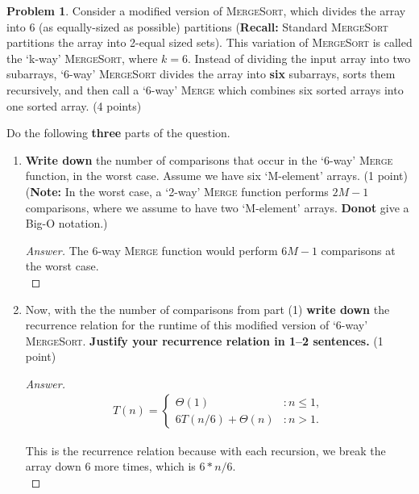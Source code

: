 \documentclass[11pt]{article}
\theoremstyle{definition}
\theoremstyle{definition}
\newtheorem{required}{Problem}
\theoremstyle{definition}
\begin{document}
\setcounter{required}{18}
\begin{required} 
Consider a modified version of \textsc{MergeSort}, which divides the array into 6 (as equally-sized as possible) partitions (\textbf{Recall:} Standard \textsc{MergeSort} partitions the array into 2-equal sized sets). This variation of \textsc{MergeSort} is called the `k-way' \textsc{MergeSort}, where $k = 6$. Instead of dividing
the input array into two subarrays, `6-way' \textsc{MergeSort} divides the array into \textbf{six} subarrays, sorts them recursively, and then call a `6-way' \textsc{Merge} which combines six sorted arrays into one sorted array. (4 points)

Do the following \textbf{three} parts of the question.

\begin{enumerate}
\item \textbf{Write down} the number of comparisons that occur in the `6-way' \textsc{Merge} function, in the worst case. Assume we have six `M-element' arrays. (1 point) \\
(\textbf{Note:} In the worst case, a `2-way' \textsc{Merge} function performs $2M-1$ comparisons, where we assume to have two `M-element' arrays. \textbf{Donot} give a Big-O notation.)

\begin{proof}[Answer]
	The 6-way \textsc{Merge} function would perform $6M - 1$ comparisons at the worst case.\\
\end{proof}

\vspace{1in}

\item Now, with the the number of comparisons from part (1) \textbf{write down} the recurrence relation for the runtime of this modified version of `6-way' \textsc{MergeSort}. \textbf{Justify your recurrence relation in 1--2 sentences.} (1 point)
\begin{proof}[Answer]
\begin{align*}
	T(n) = \begin{cases}
		\Theta(1) & : n \leq 1, \\
		6T(n/6) + \Theta(n) & : n > 1.
	\end{cases}
\end{align*}

This is the recurrence relation because with each recursion, we break the array down 6 more times, which is $6 * n/6$.\\


\end{proof}
\end{enumerate}
\end{required}
\end{document}

